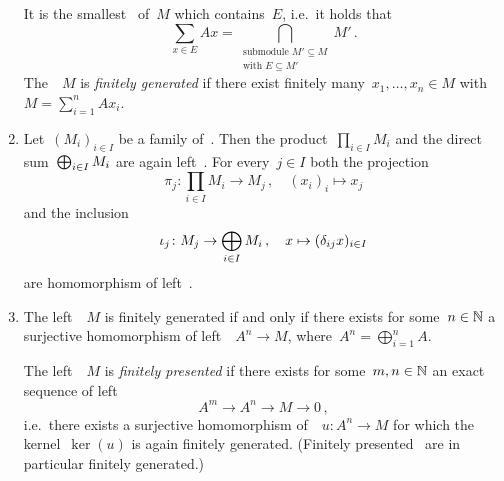 \begin{remarkdefinition}
\begin{enumerate}
      It is the smallest~{\Asmod} of~$M$ which contains~$E$, i.e.\ it holds that
      \[
          \sum_{x \in E} Ax
        = \bigcap_{\substack{\text{submodule $M' \subseteq M$} \\ \text{with $E \subseteq M'$}}} M' \,.
      \]
      The~{\Amod}~$M$ is \emph{finitely generated} if there exist finitely many~$x_1, \dotsc, x_n \in M$ with~$M = \sum_{i=1}^n A x_i$.
    \item
      Let~$(M_i)_{i \in I}$ be a family of~{\Amods}.
      Then the product~$\prod_{i \in I} M_i$ and the direct sum~$\bigoplus_{i \in I} M_i$ are again left~{\Amods}.
      For every~$j \in I$ both the projection
      \[
                \pi_j
        \colon  \prod_{i \in I} M_i
        \to     M_j \,,
        \quad   (x_i)_i
        \mapsto x_j
      \]
      and the inclusion
      \[
                \iota_j
        \colon  M_j
        \to     \bigoplus_{i \in I} M_i \,,
        \quad   x
        \mapsto ( \delta_{ij} x )_{i \in I}
      \]
      are homomorphism of left~{\Amods}.
    \item
      The left~{\Amod}~$M$ is finitely generated if and only if there exists for some~$n \in \mathbb{N}$ a surjective homomorphism of left~{\Amods}~$A^n \to M$, where~$A^n = \bigoplus_{i=1}^n A$.
      
      The left~{\Amod}~$M$ is \emph{finitely presented} if there exists for some~$m, n \in \mathbb{N}$ an exact sequence of left~{\Amods}
      \[
            A^m
        \to A^n
        \to M
        \to 0 \,,
      \]
      i.e.~there exists a surjective homomorphism of~{\Amods}~$u \colon A^n \to M$ for which the kernel~$\ker(u)$ is again finitely generated.
      (Finitely presented~{\Amods} are in particular finitely generated.)
  \end{enumerate}
\end{remarkdefinition}


